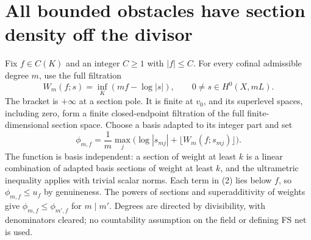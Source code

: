 \documentclass[11pt]{article}
\begin{document}
\section{All bounded obstacles have section density off the divisor}
Fix $f\in C(K)$ and an integer $C\geq1$ with $|f|\leq C$.
For every cofinal admissible degree $m$, use the full filtration
\[
 W_m(f;s)=\inf_K(mf-\log|s|),\qquad0\neq s\in H^0(X,mL).
                                                        \tag{1}
\]
The bracket is $+\infty$ at a section pole. It is finite at $v_0$,
and its superlevel spaces, including zero, form a finite closed-endpoint
filtration of the full finite-dimensional section space. Choose a basis
adapted to its integer part and set
\[
 \phi_{m,f}=\frac1m\max_j
        \bigl(\log|s_{mj}|+\lfloor W_m(f;s_{mj})\rfloor\bigr).
                                                        \tag{2}
\]
The function is basis independent: a section of weight at least $k$
is a linear combination of adapted basis sections of weight at least
$k$, and the ultrametric inequality applies with trivial scalar norms.
Each term in (2) lies below $f$, so $\phi_{m,f}\leq u_f$ by genuineness.
The powers of sections and superadditivity of weights give
$\phi_{m,f}\leq\phi_{m',f}$ for $m\mid m'$.
Degrees are directed by divisibility, with denominators cleared;
no countability assumption on the field or defining FS net is used.
\end{document}
